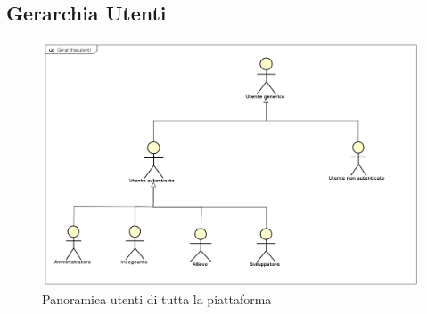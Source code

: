\subsection{Gerarchia Utenti}
\begin{figure}[H]
\centering
\includegraphics[width=17cm]{img/Gerarchia_utenti.png} 
\caption{Panoramica utenti di tutta la piattaforma}\label{fig:1}
\end{figure}